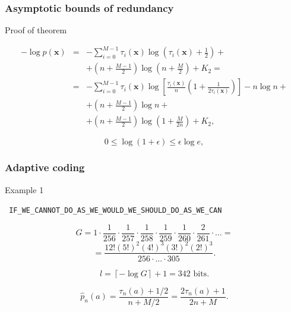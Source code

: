 \documentclass[14pt]{beamer}
\renewcommand{\vec}[1]{\ensuremath{\boldsymbol{#1}}}
\begin{document}
\begin{frame}
\frametitle{Asymptotic bounds of redundancy}
Proof of theorem
\begin{itemize}    
\footnotesize {
    
    \item
    \begin{eqnarray*}
    -\log p(\vec x)&=&%
    -\sum_{i=0}^{M-1} \tau_i(\vec x) %
    \log \left( \tau_i(\vec x)+\frac{1}{2}\right)+\\%
    && +\left(
    n+\frac{M-1}{2} \right) \log \left( n+\frac{M}{2}
    \right)+K_2= \\
    &=&-\sum_{i=0}^{M-1} \tau_i(\vec x) %
    \log \left[ \frac{\tau_i(\vec x)}{n}\left(1+%
    \frac{1}{2\tau_i(\vec x)}\right)\right]-n\log n+\\%
    &&+\left( n+\frac{M-1}{2} \right)\log n +\\
    &&+ \left( n+\frac{M-1}{2} \right)\log \left( 1+\frac{M}{2n}
    \right)+K_2,
    \end{eqnarray*}
    
    \item
    \[
    0 \le \log(1+\epsilon) \le \epsilon \log e,
    \]
}    
\end{itemize}
\end{frame}




\begin{frame}
\frametitle{Adaptive coding}
Example 1
\begin{itemize}    

    
\footnotesize {
    \item
    \begin{center}{\texttt{
    IF{\_}WE{\_}CANNOT{\_}DO{\_}AS{\_}WE{\_}WOULD{\_}WE{\_}SHOULD{\_}DO{\_}AS{\_}WE{\_}CAN} }\\
    \end{center}
}
\small{
    \item
    \[
    G = 1 \cdot \frac{1}{256}\cdot \frac{1}{257}\cdot  \frac{1}{258}
     \cdot\frac{1}{259}\cdot\frac{1}{260}\cdot\frac{2}{261} \cdot\ldots=
    \]
    \[ =\frac{12!(5!)^2(4!)^3(3!)^2(2!)^3}{256\cdot\ldots\cdot305}.
    \]
    
    \item 
    \begin{equation}
    \label{examp_alg_1} l = \left\lceil { - \log G} \right\rceil + 1 =
    342\mbox{ bits} .
    \end{equation}


    \item
    \begin{equation}
    \label{eq3_37a} \hat {p}_n (a) = \frac{\tau _n (a) + 1/2}{n + M/2}=
    \frac{2\tau _n (a) + 1}{2n + M}.
    \end{equation}
}    
\end{itemize}
\end{frame}
\end{document}
